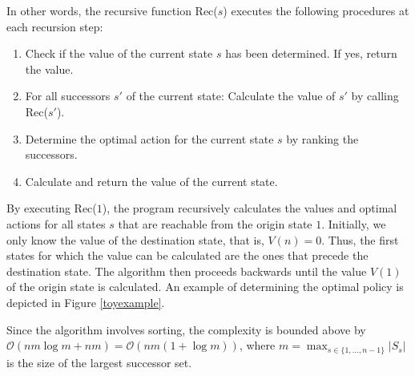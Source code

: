 \documentclass[dissertation,draft*]{aaltoseries}
\begin{document}
In other words, the recursive function Rec($s$) executes the following procedures at each recursion step:
\begin{enumerate}
 \item 
Check if the value of the current state $s$ has been determined. If yes, return the value.
\item
For all successors $s'$ of the current state: Calculate the value of $s'$ by calling Rec($s'$).
\item
Determine the optimal action for the current state $s$ by ranking the successors.
\item
Calculate and return the value of the current state.
\end{enumerate}
By executing Rec($1$), the program recursively calculates the values and optimal actions for 
all states $s$ that are reachable from the origin state $1$.
Initially, we only know the value of the destination state, that is, $V(n)=0$.
Thus, the first states for which the value can be calculated
are the ones that precede the destination state. 
The algorithm then proceeds backwards until the value $V(1)$ of the origin state is calculated.
An example of determining the optimal policy is depicted in Figure \ref{toyexample}.


Since the algorithm involves sorting, the complexity is bounded above by $\mathcal{O}(n m \log m + nm) = \mathcal{O}(n m (1+\log m))$,
where $m = \max_{s \in \{1,\ldots,n-1\}}|S_s|$ is the size of the largest successor set. 
\end{document}
